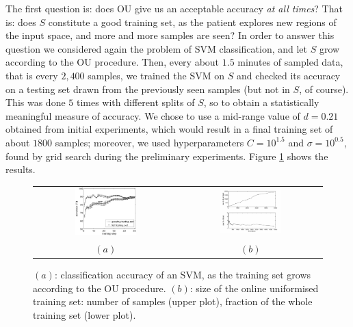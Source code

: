The first question is: does OU give us an acceptable accuracy \emph{at
all times}? That is: does $S$ constitute a good training set, as the
patient explores new regions of the input space, and more and more
samples are seen? In order to answer this question we considered again
the problem of SVM classification, and let $S$ grow according to the
OU procedure. Then, every about $1.5$ minutes of sampled data, that is
every $2,400$ samples, we trained the SVM on $S$ and checked its
accuracy on a testing set drawn from the previously seen samples (but
not in $S$, of course). This was done $5$ times with different splits
of $S$, so to obtain a statistically meaningful measure of
accuracy. We chose to use a mid-range value of $d = 0.21$ obtained
from initial experiments, which would result in a final training set
of about $1800$ samples; moreover, we used hyperparameters $C =
10^{1.5}$ and $\sigma = 10^{0.5}$, found by grid search during the
preliminary experiments. Figure \ref{fig:inc} shows the results.

\begin{figure}[!ht] \centering
  \begin{tabular}{cc}
    \includegraphics[width=0.45\textwidth]{figs/fig_resInc_OU21.eps} &
    \includegraphics[width=0.45\textwidth]{figs/fig_growth_OU21.eps} \\
    $(a)$ & $(b)$ \\
  \end{tabular}
  \caption{$(a)$: classification accuracy of an SVM, as the training set
    grows according to the OU procedure. $(b)$:
    size of the online uniformised training set: number of samples
    (upper plot), fraction of the whole training set (lower plot).}
  \label{fig:inc}
\end{figure}

